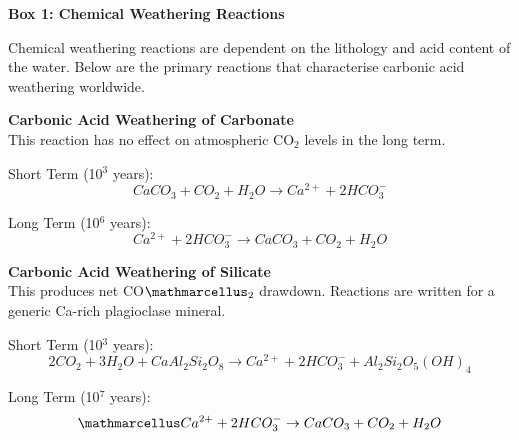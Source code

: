 \newpage

\begin{tcolorbox}[
    colback=customcolor, %
    colframe=white,      %
    sharp corners,       %
    boxrule=0pt,         %
    breakable,           %
    width=\dimexpr\textwidth+2cm\relax, %
    enlarge left by=-1cm,   %
    leftrule=0mm,        %
    rightrule=0mm,       %
    toprule=0mm,         %
    bottomrule=0mm       %
]
\textbf{\Large Box 1: Chemical Weathering Reactions}
\vspace{-3mm}
\myline\\
{\footnotesize
Chemical weathering reactions are dependent on the lithology and acid content of the water. Below are the primary reactions that characterise carbonic acid weathering worldwide.

\bsk

\textbf{Carbonic Acid Weathering of Carbonate}\\
This reaction has no effect on atmospheric CO$_2$ levels in the long term.

    \begin{center}
    
    Short Term (10$^3$ years):
    \begin{equation}
    CaCO_3 + CO_2 + H_2O \rightarrow Ca^{2+} + 2HCO_3^-
    \end{equation}
    
    Long Term (10$^6$ years):
    \begin{equation}
    Ca^{2+} + 2HCO_3^- \rightarrow CaCO_3 + CO_2 + H_2O
    \end{equation}

    \end{center}
    
    
\textbf{Carbonic Acid Weathering of Silicate}\\ This produces net CO$\ttmath{_2}$ drawdown. Reactions are written for a generic Ca-rich plagioclase mineral.

    \begin{center}

    Short Term (10$^3$ years):
    \begin{equation}
    2CO_2 + 3H_2O + CaAl_2Si_2O_8 \rightarrow Ca^{2+} + 2HCO_3^- + Al_2Si_2O_5(OH)_4
    \end{equation}
    
    Long Term (10$^7$ years):
    \begin{equation}
    \ttmath{Ca^{2+} + 2HCO_3^- \rightarrow CaCO_3 + CO_2 + H_2O}
    \end{equation}
    
    \end{center}

}
\end{tcolorbox}


